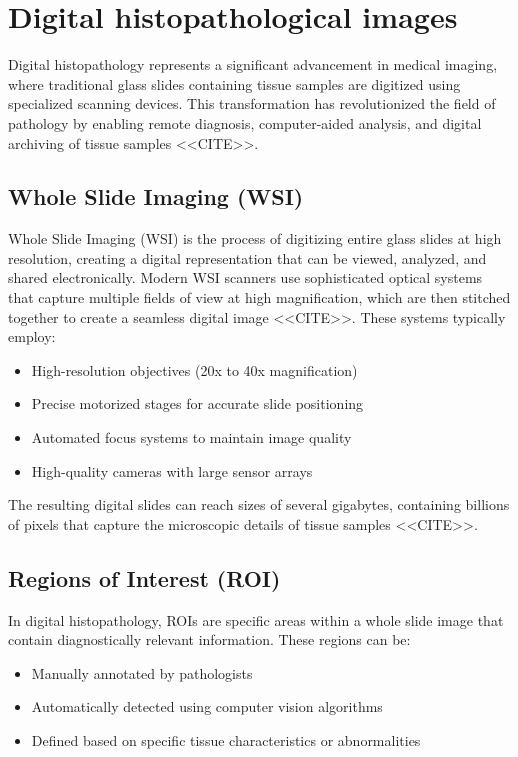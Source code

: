 \section{Digital histopathological images}

Digital histopathology represents a significant advancement in
medical imaging, where traditional glass slides containing tissue
samples are digitized using specialized scanning devices. This
transformation has revolutionized the field of pathology by enabling
remote diagnosis, computer-aided analysis, and digital archiving of
tissue samples <<CITE>>.

\subsection{Whole Slide Imaging (WSI)}

Whole Slide Imaging (WSI) is the process of digitizing entire glass
slides at high resolution, creating a digital representation that can
be viewed, analyzed, and shared electronically. Modern WSI scanners
use sophisticated optical systems that capture multiple fields of
view at high magnification, which are then stitched together to
create a seamless digital image <<CITE>>. These systems typically employ:

\begin{itemize}
  \item High-resolution objectives (20x to 40x magnification)
  \item Precise motorized stages for accurate slide positioning
  \item Automated focus systems to maintain image quality
  \item High-quality cameras with large sensor arrays
\end{itemize}

The resulting digital slides can reach sizes of several gigabytes,
containing billions of pixels that capture the microscopic details of
tissue samples <<CITE>>.

\subsection{Regions of Interest (ROI)}

In digital histopathology, \glspl{ROI} are specific areas within a
whole slide image that contain diagnostically relevant information.
These regions can be:

\begin{itemize}
  \item Manually annotated by pathologists
  \item Automatically detected using computer vision algorithms
  \item Defined based on specific tissue characteristics or abnormalities
\end{itemize}


